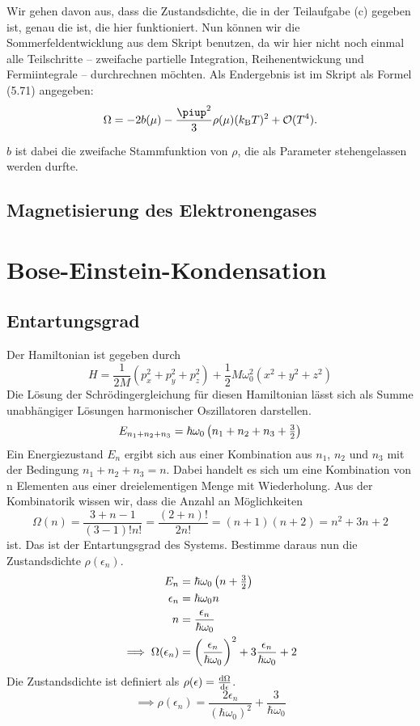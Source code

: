 Wir gehen davon aus, dass die Zustandsdichte, die in der Teilaufgabe (c)
gegeben ist, genau die ist, die hier funktioniert. Nun können wir die
Sommerfeldentwicklung aus dem Skript benutzen, da wir hier nicht noch einmal
alle Teilschritte – zweifache partielle Integration, Reihenentwickung und
Fermiintegrale – durchrechnen möchten. Als Endergebnis ist im Skript als Formel
(5.71) angegeben:
\[
    \Omega = - 2 b(\mu) - \frac{\piup^2}3 \rho(\mu) (\kB T)^2 + \mathcal
    O(T^4).
\]

$b$ ist dabei die zweifache Stammfunktion von $\rho$, die als Parameter
stehengelassen werden durfte.

\subsection{Magnetisierung des Elektronengases}

\fehlt


\section{Bose-Einstein-Kondensation}
\subsection{Entartungsgrad}
Der Hamiltonian ist gegeben durch
\[H = \frac{1}{2M}(p^2_x+p^2_y+p^2_z)+\frac{1}{2}M \omega^2_0(x^2+y^2+z^2) \]
Die Lösung der Schrödingergleichung für diesen Hamiltonian lässt sich als Summe unabhängiger Lösungen harmonischer Oszillatoren darstellen.
\[E_{n_1+n_2+n_3} = \hbar \omega_0 \del{n_1+n_2+n_3+\tfrac{3}{2}} \]
Ein Energiezustand $E_n$ ergibt sich aus einer Kombination aus $n_1$, $n_2$ und $n_3$ mit der Bedingung $n_1+n_2+n_3=n$. Dabei handelt es sich um eine Kombination von n Elementen aus einer dreielementigen Menge mit Wiederholung. Aus der Kombinatorik wissen wir, dass die Anzahl an Möglichkeiten
\[\Omega(n)=\frac{3+n-1}{(3-1)!n!}=\frac{(2+n)!}{2n!}=(n+1)(n+2)=n^2+3n+2 \]
ist. Das ist der Entartungsgrad des Systems. Bestimme daraus nun die Zustandsdichte $\rho(\epsilon_n)$.
\begin{align*}
E_n &= \hbar \omega_0 \del{n+ \tfrac{3}{2}} \\
\epsilon_n &= \hbar \omega_0 n \\
n &= \frac{\epsilon_n}{\hbar \omega_0} \\
\implies \Omega(\epsilon_n) &= \del{\frac{\epsilon_n}{\hbar \omega_0}}^2 +3\frac{\epsilon_n}{\hbar \omega_0}+2
\end{align*}
Die Zustandsdichte ist definiert als $\rho(\epsilon)=\frac{\dif \Omega}{\dif \epsilon}$.
\[ \implies \rho(\epsilon_n) = \frac{2\epsilon_n}{(\hbar \omega_0)^2} +\frac{3}{\hbar \omega_0} \]

